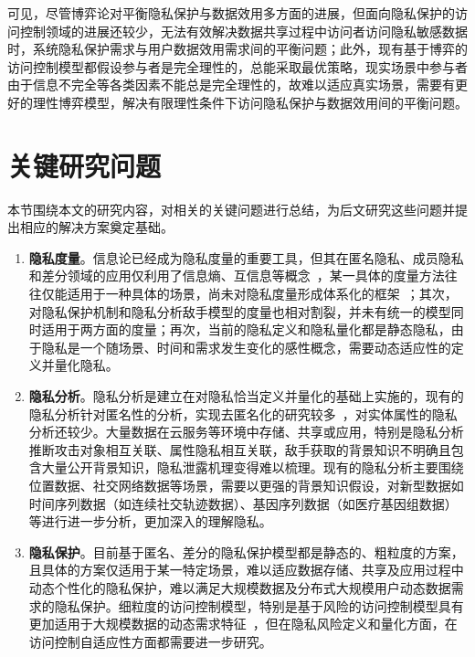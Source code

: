 可见，尽管博弈论对平衡隐私保护与数据效用多方面的进展，但面向隐私保护的访问控制领域的进展还较少，无法有效解决数据共享过程中访问者访问隐私敏感数据时，系统隐私保护需求与用户数据效用需求间的平衡问题；此外，现有基于博弈的访问控制模型都假设参与者是完全理性的，总能采取最优策略，现实场景中参与者由于信息不完全等各类因素不能总是完全理性的，故难以适应真实场景，需要有更好的理性博弈模型，解决有限理性条件下访问隐私保护与数据效用间的平衡问题。

\section{关键研究问题}

本节围绕本文的研究内容，对相关的关键问题进行总结，为后文研究这些问题并提出相应的解决方案奠定基础。

\begin{enumerate}
	\item \textbf{隐私度量}。信息论已经成为隐私度量的重要工具，但其在匿名隐私、成员隐私和差分领域的应用仅利用了信息熵、互信息等概念~\cite{wagner2018technical}，某一具体的度量方法往往仅能适用于一种具体的场景，尚未对隐私度量形成体系化的框架~\cite{shokri2011quantifying,manousakas2018quantifying}；其次，对隐私保护机制和隐私分析敌手模型的度量也相对割裂，并未有统一的模型同时适用于两方面的度量；再次，当前的隐私定义和隐私量化都是静态隐私，由于隐私是一个随场景、时间和需求发生变化的感性概念，需要动态适应性的定义并量化隐私。
	
	
	\item \textbf{隐私分析}。隐私分析是建立在对隐私恰当定义并量化的基础上实施的，现有的隐私分析针对匿名性的分析，实现去匿名化的研究较多~\cite{lin2009lbs,manousakas2018quantifying}，对实体属性的隐私分析还较少。大量数据在云服务等环境中存储、共享或应用，特别是隐私分析推断攻击对象相互关联、属性隐私相互关联，敌手获取的背景知识不明确且包含大量公开背景知识，隐私泄露机理变得难以梳理。现有的隐私分析主要围绕位置数据、社交网络数据等场景，需要以更强的背景知识假设，对新型数据如时间序列数据（如连续社交轨迹数据）、基因序列数据（如医疗基因组数据）等进行进一步分析，更加深入的理解隐私。
	
	\item  \textbf{隐私保护}。目前基于匿名、差分的隐私保护模型都是静态的、粗粒度的方案，且具体的方案仅适用于某一特定场景，难以适应数据存储、共享及应用过程中动态个性化的隐私保护，难以满足大规模数据及分布式大规模用户动态数据需求的隐私保护。细粒度的访问控制模型，特别是基于风险的访问控制模型具有更加适用于大规模数据的动态需求特征~\cite{li2017access}，但在隐私风险定义和量化方面，在访问控制自适应性方面都需要进一步研究。
	

\end{enumerate}
